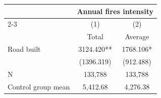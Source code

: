 {
\def\sym#1{\ifmmode^{#1}\else\(^{#1}\)\fi}
\begin{tabular}{l*{2}{c}}
\hline\hline
                         &\multicolumn{2}{c}{Annual fires intensity}\\\cmidrule(lr){2-3}
                         &\multicolumn{1}{c}{(1)}&\multicolumn{1}{c}{(2)}\\
                         &\multicolumn{1}{c}{Total}&\multicolumn{1}{c}{Average}\\
\hline
Road built               &    3124.420** &    1768.106*  \\
                         &  (1396.319)   &   (912.488)   \\
\hline
N                        &     133,788   &     133,788   \\
Control group mean       &    5,412.68   &    4,276.38   \\
\hline\hline
\end{tabular}
}
